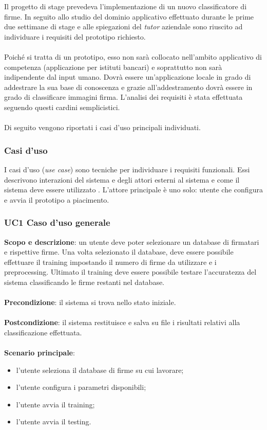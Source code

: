 Il progetto di stage prevedeva l'implementazione di un nuovo classificatore di firme. In seguito allo studio del dominio applicativo effettuato durante le prime due settimane di stage e alle spiegazioni del \emph{tutor} aziendale sono riuscito ad individuare i requisiti del prototipo richiesto.\\\\
Poiché si tratta di un prototipo, esso non sarà collocato nell'ambito applicativo di competenza (applicazione per istituti bancari) e soprattutto non sarà indipendente dal input umano. Dovrà essere un'applicazione locale in grado di addestrare la sua base di conoscenza e grazie all'addestramento dovrà essere in grado di classificare immagini firma. L'analisi dei requisiti è stata effettuata seguendo questi cardini semplicistici.\\\\
Di seguito vengono riportati i casi d'uso principali individuati.
\subsubsection{Casi d'uso}
\label{3.2.1}
I casi d'uso (\emph{use case}) sono tecniche per individuare i requisiti funzionali. Essi descrivono interazioni del sistema e degli attori esterni al sistema e come il sistema deve essere utilizzato \cite{7}.
L'attore principale è uno solo: utente che configura e avvia il prototipo a piacimento.
\subsubsection*{UC1 Caso d'uso generale}
\label{3.2.1.1}
\textbf{Scopo e descrizione}: un utente deve poter selezionare un database di firmatari e rispettive firme. Una volta selezionato il database, deve essere possibile effettuare il training impostando il numero di firme da utilizzare e i preprocessing. Ultimato il training deve essere possibile testare l'accuratezza del sistema classificando le firme restanti nel database.\\\\
\textbf{Precondizione}: il sistema si trova nello stato iniziale.\\\\
\textbf{Postcondizione}: il sistema restituisce e salva su file i risultati relativi alla classificazione effettuata.\\\\
\textbf{Scenario principale}:
\begin{itemize}
\item l'utente seleziona il database di firme su cui lavorare;
\item l'utente configura i parametri disponibili;
\item l'utente avvia il training;
\item l'utente avvia il testing.
\end{itemize}

